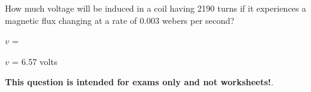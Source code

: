 

How much voltage will be induced in a coil having 2190 turns if it experiences a magnetic flux changing at a rate of 0.003 webers per second?

\vskip 10pt

$v$ = 







$v$ = 6.57 volts







{\bf This question is intended for exams only and not worksheets!}.



